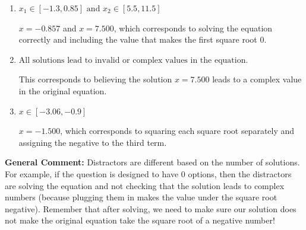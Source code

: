 \documentclass{extbook}[14pt]
\begin{document}
\begin{enumerate}
{\begin{enumerate}[label=\Alph*.]
$x = -0.857$ and $x = 1.000$, which corresponds to solving each radical separately for 0.
\item \( x_1 \in [-1.3, 0.85] \text{ and } x_2 \in [5.5,11.5] \)

$x = -0.857$ and $x = 7.500$, which corresponds to solving the equation correctly and including the value that makes the first square root 0.
\item \( \text{All solutions lead to invalid or complex values in the equation.} \)

This corresponds to believing the solution $x = 7.500$ leads to a complex value in the original equation.
\item \( x \in [-3.06,-0.9] \)

$x = -1.500$, which corresponds to squaring each square root separately and assigning the negative to the third term.
\end{enumerate}

\textbf{General Comment:} Distractors are different based on the number of solutions. For example, if the question is designed to have 0 options, then the distractors are solving the equation and not checking that the solution leads to complex numbers (because plugging them in makes the value under the square root negative). Remember that after solving, we need to make sure our solution does not make the original equation take the square root of a negative number!
}
\end{enumerate}
\end{document}
